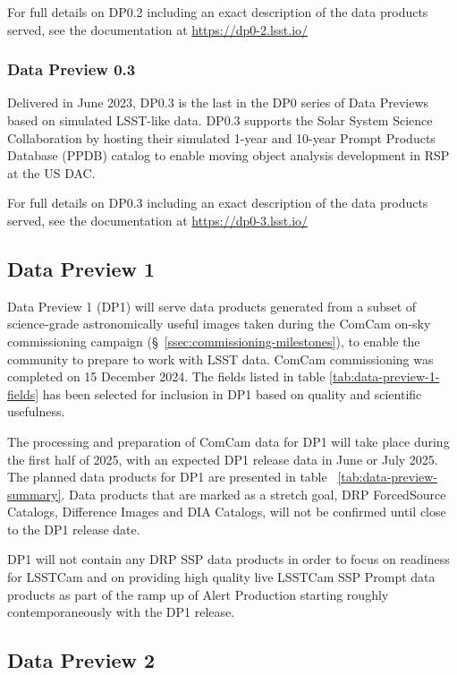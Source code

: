 For full details on DP0.2 including an exact description of the data products served, see the documentation at \url{https://dp0-2.lsst.io/}

\subsubsection{Data Preview 0.3}
\label{sec:dp03}

Delivered in June  2023, DP0.3 is the last in the DP0 series of Data Previews based on simulated LSST-like data. 
DP0.3 supports the Solar System Science Collaboration by hosting their simulated 1-year and 10-year Prompt Products Database (PPDB) catalog to enable moving object analysis development  in  RSP at the US DAC. 

For full details on DP0.3 including an exact description of the data products served, see the documentation at \url{https://dp0-3.lsst.io/}

\subsection{Data Preview 1}
\label{sec:dp1}

Data Preview 1 (DP1) will serve data products generated from a subset of science-grade astronomically useful images  taken  during  the ComCam on-sky commissioning campaign (\S~\ref{ssec:commissioning-milestones}), to enable the community to prepare to work with LSST data. 
ComCam commissioning was completed on 15 December 2024. 
The fields listed in table \ref{tab:data-preview-1-fields} has been selected for inclusion in DP1 based on  quality and scientific usefulness. 


The processing and preparation of ComCam data for DP1 will take place during the first half of 2025, with an expected DP1 release data in June or July 2025. 
The planned data products for DP1 are presented in table~ \ref{tab:data-preview-summary}. 
Data products that are marked as a stretch goal, DRP ForcedSource Catalogs, Difference Images and DIA Catalogs,  will not be confirmed until close to the DP1 release date. 

DP1 will not contain any DRP  SSP data products in order to focus on readiness for LSSTCam and on providing high quality live LSSTCam SSP Prompt data products as part of the ramp up of Alert Production starting roughly contemporaneously with the DP1 release.


\subsection{Data Preview 2}
\label{sec:dp2}

